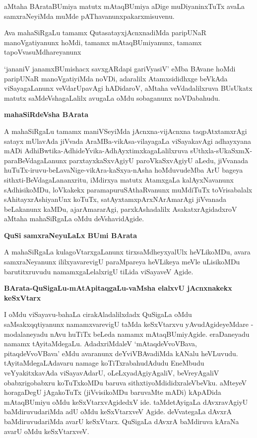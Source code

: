 aMtaha BArataBUmiya matutx mAtaqBUmiya aDige muDiyaninxTuTx avaLa samxraNeyiMda muMde pAThavanunxpakarxmisuvenu.

Ava mahaSiRgaLu tamamx QutasatayxjAcnxnadiMda paripUNaR manoVgatiyanunx hoMdi, tamamx mAtaqBUmiyanunx, tamamx tapoVvasuMdhareyanunx 

`jananiV janamxBUmishacx savxgARdapi gariVyasiV'\label{103} eMba BAvane hoMdi paripUNaR manoVgatiyiMda noVDi, adaralilx Atamxsididhxge beVkAda viSayagaLanunx veVdarUpavAgi hADidaroV, aMtaha veVdadalilxruva BUsUkatx matutx saMdeVshagaLalilx avugaLa oMdu sobaganunx noVDabahudu.

\noindent
\textbf{mahaSiRdeVsha BArata}\label{page103}

A mahaSiRgaLu tamamx maniVSeyiMda jAcnxna-vijAcnxna taqpAtxtamxrAgi satayx mUlavAda jiVvada AraMBa-vikAsa-vilayagaLa viSayakavAgi adhayxyana mADi AdhiBwtika-AdhideYvika-AdhAyxtimxkagaLalilxruva sUthxla-sUkaSxmX-paraBeVdagaLanunx parxtayxkaSxvAgiyU paroVkaSxvAgiyU aLedu, jiVvanada huTuTx-iruvu-beLavaNige-vikAra-kaSxya-nAsha hoMduvudeMba ArU bageya sithxti-BeVdagaLananxritu, iMdirxya matutx AtamxgaLa kalAyxNavanunx sAdhisikoMDu, loVkakekx paramapuruSAthaRvanunx muMdiTuTx toVrisabalalx sAhitayxrAshiyanUnx koTuTx, satAyxtamxpArxNArAmarAgi jiVvanada beLakanunx kaMDu, ajarAmararAgi, parxkAshadalilx AsakatxrAgidadxroV aMtaha mahaSiRgaLa oMdu deVshavidAgide.

\noindent
\textbf{QuSi samxraNeyuLaLx BUmi BArata}\label{page104}

A mahaSiRgaLa kulagoVtarxgaLanunx tirxsaMdheyxyalUlx heVLikoMDu, avara samxraNeyanunx ililxyavarevigU paraMpareya heVLikeya meVle uLisikoMDu barutitxruvudu namamxgaLelalxrigU tiLida viSayaveV Agide.

\noindent
\textbf{BArata-QuSigaLu-mAtApitaqgaLu-vaMsha elalxvU jAcnxnakekx keSxVtarx}\label{page104}

I oMdu viSayavu-bahaLa cirakAladalilxdadx QuSigaLa oMdu saMsakxqqtiyanunx namamxvarevigU taMda keSxVtarxvu yAvudAgideyeMdare - modalaneyadu nAvu huTiTx beLeda namamx mAtaqBUmiyAgide. eraDaneyadu namamx tAyitaMdegaLu. AdadxriMdaleV `mAtaqdeVvoVBava, pitaqdeVvoVBava' eMdu avaranunx deYviVBAvadiMda kANalu heVLuvudu. tAyitaMdegaLAdavaru namage koTiTxrabahudAdudu EneMbudu veYyakitxkavAda viSayavAdarU, oLeLxyadAgiyAgaliV, beVreyAgaliV obabxrigobabxru koTuTxkoMDu baruva sithxtiyoMdididxraleVbeVku. aMteyeV horagaDegU jAgakoTuTx (jiVvisikoMDu baruvaMte mADi) kApADida mAtaqBUmiyu oMdu keSxVtarxvAgidedxV ide. taMdetAyigaLa dAvxravAgiyU baMdiruvudariMda adU oMdu keSxVtarxveV Agide. deVvategaLa dAvxrA baMdiruvudariMda avarU keSxVtarx. QuSigaLa dAvxrA baMdiruva kAraNa avarU oMdu keSxVtarxveV.

